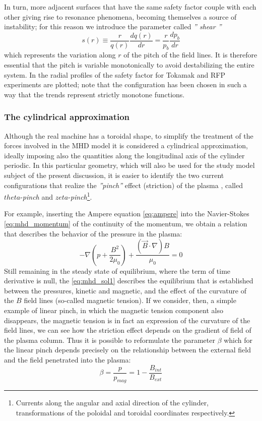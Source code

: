 In turn, more adjacent surfaces that have the same safety factor couple with each other giving rise to resonance phenomena, becoming themselves a source of instability; for this reason we introduce the parameter called \emph{'' shear ''}
%
\begin{equation}
 s(r) \equiv \frac{r}{q(r)}\frac{dq(r)}{dr} = \frac{r}{p_b}\frac{dp_b}{dr}
\end{equation}
%
which represents the variation along $r$ of the pitch of the field lines. It is therefore essential that the pitch is variable monotonically to avoid destabilizing the entire system.
In \Figure{\ref{fig:profiles-tokarfp}} the radial profiles of the safety factor for Tokamak and RFP experiments are plotted; note that the configuration has been chosen in such a way that the trends represent strictly monotone functions.

\subsubsection{The cylindrical approximation}

Although the real machine has a toroidal shape, to simplify the treatment of the forces involved in the MHD model it is considered a cylindrical approximation, ideally imposing also the quantities along the longitudinal axis of the cylinder periodic. In this particular geometry, which will also be used for the study model subject of the present discussion, it is easier to identify the two current configurations that realize the  \emph{''pinch''} effect (striction) of the plasma \cite{fridberg}\cite{ortolani}, called $theta$-\emph{pinch} and $zeta$-\emph{pinch}\footnote{Currents along the angular and axial direction of the cylinder, transformations of the poloidal and toroidal coordinates respectively.}.

For example, inserting the Ampere equation \eqref{eq:ampere} into the Navier-Stokes \eqref{eq:mhd_momentum} of the continuity of the momentum, we obtain a relation that describes the behavior of the pressure in the plasma:
\begin{equation}
 \label{eq:mhd_sol1}
 -\nabla \left( p+\frac{B^2}{2\mu_0} \right) + \frac{
  (\Vec{B}\cdot\nabla)B}{\mu_0} = 0
\end{equation}
Still remaining in the steady state of equilibrium, where the term of time derivative is null, the \eqref{eq:mhd_sol1} describes the equilibrium that is established between the pressures, kinetic and magnetic, and the effect of the curvature of the ${B}$ field lines (so-called magnetic tension). If we consider, then, a simple example of linear pinch, in which the magnetic tension component also disappears, the magnetic tension is in fact an expression of the curvature of the field lines, we can see how the striction effect depends on the gradient of field of the plasma column. Thus it is possible to reformulate the parameter $ \beta $ which for the linear pinch depends precisely on the relationship between the external field and the field penetrated into the plasma:
\begin{equation}
\beta = \frac{p}{p_{mag}} = 1-\frac{B_{int}}{B_{ext}}
\end{equation}



